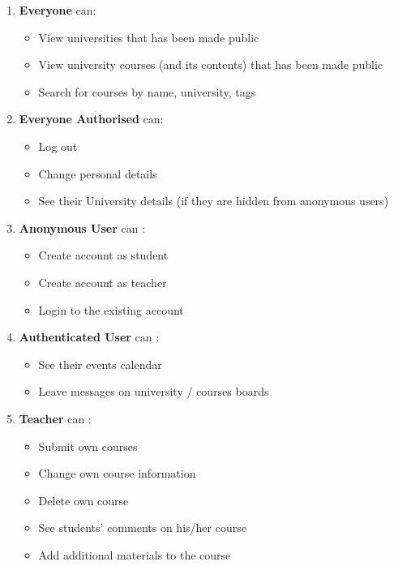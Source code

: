 \documentclass[a4paper,11pt,twoside]{report}
\theoremstyle{definition}
\begin{document}
\begin{enumerate}
	\itemsep0em 
    \item \textbf{Everyone} can: 
    \begin{itemize}
        \vspace{-0.2cm}\item View universities that has been made public
        \vspace{-0.2cm}\item View university courses (and its contents) that has been made public
        \vspace{-0.2cm}\item Search for courses by name, university, tags
    \end{itemize}
    
    
    \item \textbf{Everyone Authorised} can: 
    \begin{itemize}
        \item Log out
        \item Change personal details
        \item See their University details (if they are hidden from anonymous users)
    \end{itemize}
    
    \item \textbf{Anonymous User} can :
    \begin{itemize}
        \item Create account as student
        \item Create account as teacher
        \item Login to the existing account
    \end{itemize}
    
    \item \textbf{Authenticated User} can :
     \begin{itemize}
        \item See their events calendar
        \item Leave messages on university / courses boards
    \end{itemize}

    \item \textbf{Teacher} can :
     \begin{itemize}
        \item Submit own courses
        \item Change own course information
        \item Delete own course
        \item See students' comments on his/her course
        \item Add additional materials to the course
    \end{itemize}
    

\end{enumerate}
\end{document}
